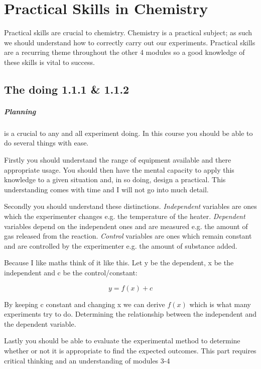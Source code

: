 \chapter{Practical Skills in Chemistry}
	Practical skills are crucial to chemistry. Chemistry is a practical subject; as such we should understand how to correctly carry out our experiments. Practical skills are a recurring theme throughout the other 4 modules so a good knowledge of these skills is vital to success.

\section{The doing 1.1.1 \& 1.1.2}
	\paragraph{Planning} is a crucial to any and all experiment doing. In this course you should be able to do several things with ease.
	
	Firstly you should understand the range of equipment available and there appropriate usage. You should then have the mental capacity to apply this knowledge to a given situation and, in so doing, design a practical. This understanding comes with time and I will not go into much detail.
	
	Secondly you should understand these distinctions. \textit{Independent} variables are ones which the experimenter changes e.g. the temperature of the heater. \textit{Dependent} variables depend on the independent ones and are measured e.g. the amount of gas released from the reaction. \textit{Control} variables are ones which remain constant and are controlled by the experimenter e.g. the amount of substance added.
	
	Because I like maths think of it like this. Let y be the dependent, x be the independent and c be the control/constant:
	
	\begin{center}
	\[y= f(x) + c\]
	\end{center}
	
	By keeping c constant and changing x we can derive $f(x)$ which is what many experiments try to do. Determining the relationship between the independent and the dependent variable.
	
	Lastly you should be able to evaluate the experimental method to determine whether or not it is appropriate to find the expected outcomes. This part requires critical thinking and an understanding of modules 3-4
	

